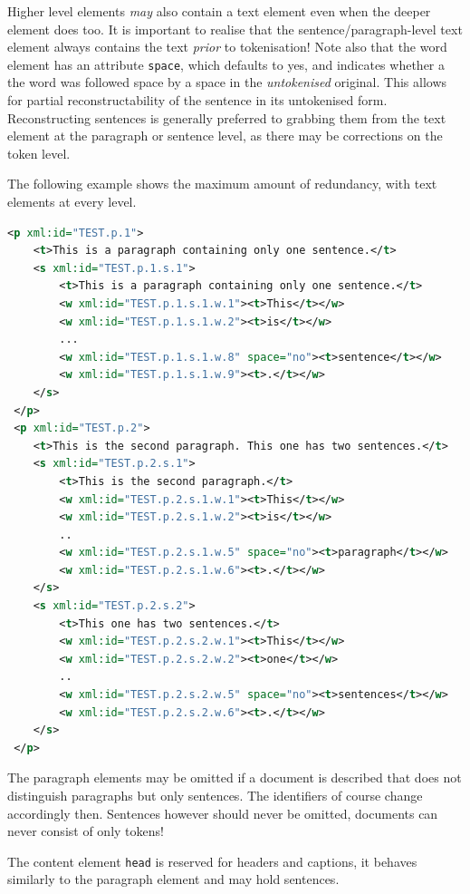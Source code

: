 \documentclass[a4paper,12pt]{report}
\begin{document}
Higher level elements \emph{may} also contain a text element even when the deeper element does too. It is important to realise that the sentence/paragraph-level text element always contains the text \emph{prior} to tokenisation! Note also that the word element has an attribute \texttt{space}, which defaults to yes, and indicates whether a the word was followed space by a space in the \emph{untokenised} original. This allows for partial reconstructability of the sentence in its  untokenised form. Reconstructing sentences is generally preferred to grabbing them from the text element at the paragraph or sentence level, as there may be corrections on the token level.

The following example shows the maximum amount of redundancy, with text elements at every level.

\begin{lstlisting}[language=xml]
 <p xml:id="TEST.p.1">
    <t>This is a paragraph containing only one sentence.</t>
    <s xml:id="TEST.p.1.s.1">        
        <t>This is a paragraph containing only one sentence.</t>
        <w xml:id="TEST.p.1.s.1.w.1"><t>This</t></w>
        <w xml:id="TEST.p.1.s.1.w.2"><t>is</t></w>
        ...
        <w xml:id="TEST.p.1.s.1.w.8" space="no"><t>sentence</t></w>
        <w xml:id="TEST.p.1.s.1.w.9"><t>.</t></w>
    </s>
 </p>
 <p xml:id="TEST.p.2">
    <t>This is the second paragraph. This one has two sentences.</t>
    <s xml:id="TEST.p.2.s.1">
        <t>This is the second paragraph.</t>
        <w xml:id="TEST.p.2.s.1.w.1"><t>This</t></w>
        <w xml:id="TEST.p.2.s.1.w.2"><t>is</t></w>    
        ..
        <w xml:id="TEST.p.2.s.1.w.5" space="no"><t>paragraph</t></w>    
        <w xml:id="TEST.p.2.s.1.w.6"><t>.</t></w>    
    </s>
    <s xml:id="TEST.p.2.s.2">
        <t>This one has two sentences.</t>
        <w xml:id="TEST.p.2.s.2.w.1"><t>This</t></w>
        <w xml:id="TEST.p.2.s.2.w.2"><t>one</t></w>    
        ..
        <w xml:id="TEST.p.2.s.2.w.5" space="no"><t>sentences</t></w>    
        <w xml:id="TEST.p.2.s.2.w.6"><t>.</t></w>    
    </s>
 </p>
\end{lstlisting}

The paragraph elements may be omitted if a document is described that does not distinguish paragraphs but only sentences. The identifiers of course change accordingly then. Sentences however should never be omitted, documents can never consist of only tokens!

The content element \texttt{head} is reserved for headers and captions, it behaves similarly to the paragraph element and may hold sentences.
\end{document}
